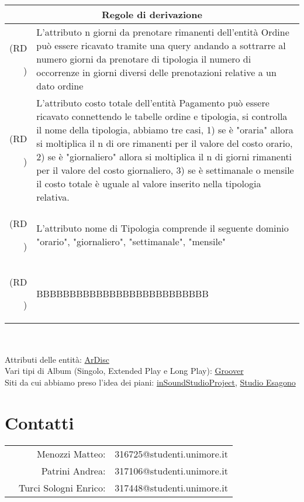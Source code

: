 \documentclass{article}
\newcounter{counteroperazioni}
\newcommand{\coperazioni}{\addtocounter{counteroperazioni}{1}\thecounteroperazioni}
\begin{document}
\begin{longtable}{|r p{.8\linewidth}|}
    
    \hline 
    \multicolumn{2}{|c|}{\textbf{Regole di derivazione}} \\ 
    \hline
    
    \setcounter{counteroperazioni}{0}
    (RD\coperazioni) & L'attributo n giorni da prenotare rimanenti dell'entità Ordine può essere ricavato tramite una query andando a sottrarre al numero giorni da prenotare di tipologia il numero di occorrenze in giorni diversi delle prenotazioni relative a un dato ordine \\
    (RD\coperazioni) & L'attributo costo totale dell'entità Pagamento può essere ricavato connettendo le tabelle ordine e tipologia, si controlla il nome della tipologia, abbiamo tre casi, 1) se è "oraria" allora si moltiplica il n di ore rimanenti per il valore del costo orario, 2) se è "giornaliero" allora si moltiplica il n di giorni rimanenti per il valore del costo giornaliero, 3) se è settimanale o mensile il costo totale è uguale al valore inserito nella tipologia relativa.   \\
    (RD\coperazioni) & L'attributo nome di Tipologia comprende il seguente dominio {"orario", "giornaliero", "settimanale", "mensile"} \\
    (RD\coperazioni) & BBBBBBBBBBBBBBBBBBBBBBBBBB \\

  \hline
\end{longtable}


\newpage
{}


\begin{tabular}{c}
\end{tabular}
\\
Attributi delle entità: \href{https://ardisc.it/musitalia/vistaHomePage.php}{ArDisc} \\
Vari tipi di Album (Singolo, Extended Play e Long Play):  \href{https://blog.groover.co/it/consigli-per-i-musicisti/ep-vs-album-it/}{Groover} \\
Siti da cui abbiamo preso l'idea dei piani: \href{https://insoundstudio.com/studio/tariffe-e-offerte}{inSoundStudioProject}, \href{https://www.studioesagono.com/studio/rates/}{Studio Esagono} \\



\newpage
\section*{Contatti}

\begin{tabular}{l r l}
& Menozzi Matteo: & 316725@studenti.unimore.it \\
& Patrini Andrea: & 317106@studenti.unimore.it \\
& Turci Sologni Enrico: & 317448@studenti.unimore.it
\end{tabular}
\end{document}
